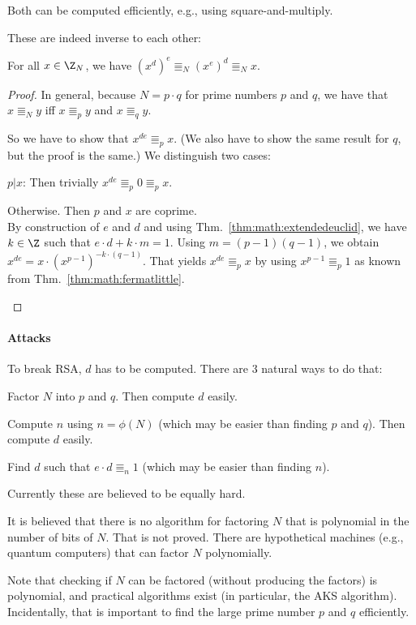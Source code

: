 Both can be computed efficiently, e.g., using square-and-multiply.

These are indeed inverse to each other:

\begin{theorem}
For all $x\in \Z_N$, we have $(x^d)^e\Equiv_N (x^e)^d \Equiv_N x$.
\end{theorem}
\begin{proof}
In general, because $N=p\cdot q$ for prime numbers $p$ and $q$, we have that $x\Equiv_N y$ iff $x\Equiv_p y$ and $x\Equiv_q y$.

So we have to show that $x^{de}\Equiv_p x$.
(We also have to show the same result for $q$, but the proof is the same.)
We distinguish two cases:
\begin{compactitem}
\item $p|x$: Then trivially $x^{de}\Equiv_p 0\Equiv_p x$.
\item Otherwise. Then $p$ and $x$ are coprime.\\
   By construction of $e$ and $d$ and using Thm.~\ref{thm:math:extendedeuclid}, we have $k\in\Z$ such that $e\cdot d+k\cdot m=1$.
   Using $m=(p-1)(q-1)$, we obtain $x^{de}=x\cdot (x^{p-1})^{-k\cdot(q-1)}$.
   That yields $x^{de}\Equiv_p x$ by using $x^{p-1}\Equiv_p 1$ as known from Thm.~\ref{thm:math:fermatlittle}.
\end{compactitem}
\end{proof}

\paragraph{Attacks}
To break RSA, $d$ has to be computed.
There are $3$ natural ways to do that:
\begin{compactitem}
 \item Factor $N$ into $p$ and $q$. Then compute $d$ easily.
 \item Compute $n$ using $n=\phi(N)$ (which may be easier than finding $p$ and $q$). Then compute $d$ easily.
 \item Find $d$ such that $e\cdot d\Equiv_n 1$ (which may be easier than finding $n$).
\end{compactitem}
Currently these are believed to be equally hard.

It is believed that there is no algorithm for factoring $N$ that is polynomial in the number of bits of $N$.
That is not proved.
There are hypothetical machines (e.g., quantum computers) that can factor $N$ polynomially.

Note that checking if $N$ can be factored (without producing the factors) is polynomial, and practical algorithms exist (in particular, the AKS algorithm).
Incidentally, that is important to find the large prime number $p$ and $q$ efficiently.
\medskip

